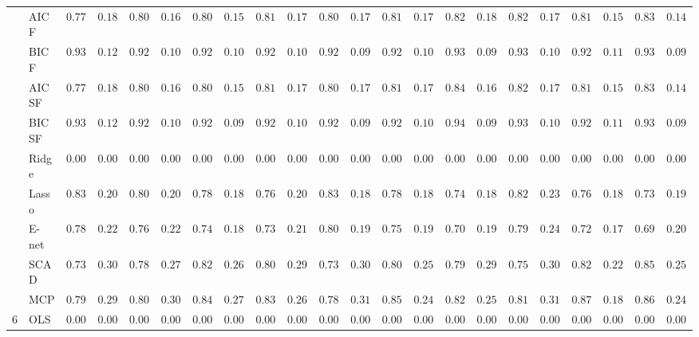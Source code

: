 \begin{tabular}{p{0.2cm}p{1cm}|p{0.6cm}p{0.6cm}|p{0.6cm}p{0.6cm}p{0.6cm}p{0.6cm}p{0.6cm}p{0.6cm}|p{0.6cm}p{0.6cm}p{0.6cm}p{0.6cm}p{0.6cm}p{0.6cm}|p{0.6cm}p{0.6cm}p{0.6cm}p{0.6cm}p{0.6cm}p{0.6cm}}
 & AIC F  & $0.7783$ & $0.1836$ & $0.8000$ & $0.1675$ & $0.8067$ & $0.1512$ & $0.8133$ & $0.1761$ & $0.8000$ & $0.1741$ & $0.8100$ & $0.1741$ & $0.8283$ & $0.1827$ & $0.8200$ & $0.1752$ & $0.8100$ & $0.1554$ & $0.8317$ & $0.1451$ \\
 & BIC F  & $0.9333$ & $0.1231$ & $0.9233$ & $0.1017$ & $0.9200$ & $0.1018$ & $0.9250$ & $0.1095$ & $0.9250$ & $0.0987$ & $0.9233$ & $0.1044$ & $0.9383$ & $0.0967$ & $0.9350$ & $0.1030$ & $0.9233$ & $0.1122$ & $0.9333$ & $0.0977$ \\
 & AIC SF  & $0.7783$ & $0.1836$ & $0.8000$ & $0.1675$ & $0.8067$ & $0.1512$ & $0.8133$ & $0.1761$ & $0.8017$ & $0.1703$ & $0.8117$ & $0.1703$ & $0.8483$ & $0.1677$ & $0.8200$ & $0.1752$ & $0.8100$ & $0.1554$ & $0.8333$ & $0.1441$ \\
 & BIC SF  & $0.9333$ & $0.1231$ & $0.9233$ & $0.1017$ & $0.9217$ & $0.0990$ & $0.9250$ & $0.1095$ & $0.9250$ & $0.0987$ & $0.9233$ & $0.1044$ & $0.9417$ & $0.0959$ & $0.9350$ & $0.1030$ & $0.9250$ & $0.1121$ & $0.9333$ & $0.0977$ \\
 & Ridge  & $0.0000$ & $0.0000$ & $0.0000$ & $0.0000$ & $0.0000$ & $0.0000$ & $0.0000$ & $0.0000$ & $0.0000$ & $0.0000$ & $0.0000$ & $0.0000$ & $0.0000$ & $0.0000$ & $0.0000$ & $0.0000$ & $0.0000$ & $0.0000$ & $0.0000$ & $0.0000$ \\
 & Lasso  & $0.8317$ & $0.2072$ & $0.8000$ & $0.2065$ & $0.7883$ & $0.1878$ & $0.7683$ & $0.2036$ & $0.8383$ & $0.1842$ & $0.7867$ & $0.1896$ & $0.7483$ & $0.1873$ & $0.8283$ & $0.2351$ & $0.7650$ & $0.1806$ & $0.7367$ & $0.1970$ \\
 & E-net  & $0.7867$ & $0.2261$ & $0.7600$ & $0.2214$ & $0.7467$ & $0.1857$ & $0.7300$ & $0.2142$ & $0.8067$ & $0.1935$ & $0.7533$ & $0.1975$ & $0.7083$ & $0.1944$ & $0.7917$ & $0.2489$ & $0.7250$ & $0.1794$ & $0.6967$ & $0.2084$ \\
 & SCAD  & $0.7383$ & $0.3091$ & $0.7800$ & $0.2761$ & $0.8250$ & $0.2631$ & $0.8083$ & $0.2905$ & $0.7367$ & $0.3099$ & $0.8033$ & $0.2577$ & $0.7900$ & $0.2955$ & $0.7533$ & $0.3057$ & $0.8217$ & $0.2213$ & $0.8500$ & $0.2557$ \\
 & MCP  & $0.7967$ & $0.2955$ & $0.8033$ & $0.3009$ & $0.8483$ & $0.2733$ & $0.8333$ & $0.2638$ & $0.7800$ & $0.3186$ & $0.8500$ & $0.2445$ & $0.8217$ & $0.2587$ & $0.8117$ & $0.3131$ & $0.8750$ & $0.1886$ & $0.8600$ & $0.2436$ \\\hline
6 & OLS  & $0.0000$ & $0.0000$ & $0.0000$ & $0.0000$ & $0.0000$ & $0.0000$ & $0.0000$ & $0.0000$ & $0.0000$ & $0.0000$ & $0.0000$ & $0.0000$ & $0.0000$ & $0.0000$ & $0.0000$ & $0.0000$ & $0.0000$ & $0.0000$ & $0.0000$ & $0.0000$ \\

\end{tabular}
